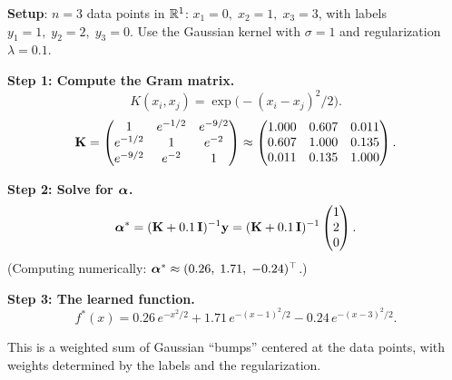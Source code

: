 \begin{notechapter}
\begin{examplebox}
\textbf{Setup}: $n = 3$ data points in $\mathbb{R}^1$: $x_1 = 0,\; x_2 = 1,\;
x_3 = 3$, with labels $y_1 = 1,\; y_2 = 2,\; y_3 = 0$. Use the Gaussian
kernel with $\sigma = 1$ and regularization $\lambda = 0.1$.

\textbf{Step 1: Compute the Gram matrix.}
\[
K(x_i, x_j) = \exp\!\bigl(-(x_i - x_j)^2/2\bigr).
\]
\[
\mathbf{K} = \begin{pmatrix}
1 & e^{-1/2} & e^{-9/2} \\
e^{-1/2} & 1 & e^{-2} \\
e^{-9/2} & e^{-2} & 1
\end{pmatrix}
\approx \begin{pmatrix}
1.000 & 0.607 & 0.011 \\
0.607 & 1.000 & 0.135 \\
0.011 & 0.135 & 1.000
\end{pmatrix}.
\]

\textbf{Step 2: Solve for $\boldsymbol{\alpha}$.}
\[
\boldsymbol{\alpha}^* = (\mathbf{K} + 0.1\,\mathbf{I})^{-1}\mathbf{y} = (\mathbf{K} +
0.1\,\mathbf{I})^{-1}\begin{pmatrix}1\\2\\0\end{pmatrix}.
\]
(Computing numerically: $\boldsymbol{\alpha}^* \approx (0.26,\; 1.71,\; -0.24)^\top$.)

\textbf{Step 3: The learned function.}
\[
f^*(x) = 0.26\,e^{-x^2/2} + 1.71\,e^{-(x-1)^2/2} - 0.24\,e^{-(x-3)^2/2}.
\]

This is a weighted sum of Gaussian ``bumps'' centered at the data
points, with weights determined by the labels and the regularization.
\end{examplebox}

\begin{figure}[ht]
\centering
{}
\end{figure}
\end{notechapter}
